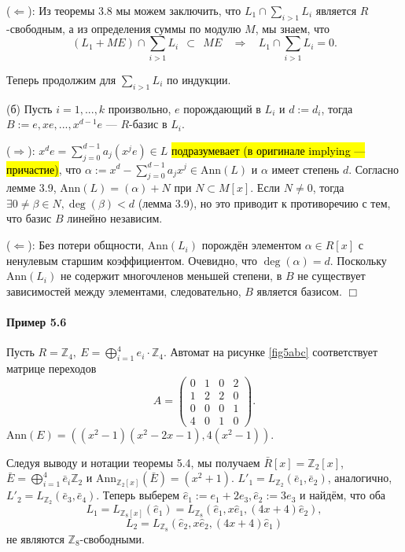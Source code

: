 \documentclass[a4paper,12pt]{article}
\newcommand{\hatei}[1]{\hat{e}_{#1}}
\newcommand{\Ann}{\text{Ann}}
\begin{document}
($\Leftarrow$): Из теоремы 3.8 мы можем заключить, что $L_1 \cap \sum_{i>1} L_i$ является $R$-свободным, а из определения суммы по модулю $M$, мы знаем, что
$$
(L_1 + M E) \cap \sum_{i>1} L_i ~~ \subset ~~ ME ~~~~ \Rightarrow ~~~~ L_1 \cap \sum_{i>1} L_i = 0.
$$

Теперь продолжим для $\sum_{i>1} L_i$ по индукции.

(б) Пусть $i = 1, ..., k$ произвольно, $e$ порождающий в $L_i$ и $d:=d_i$, тогда $B:={e, xe, ..., x^{d-1}e}$ --- $R$-базис в $L_i$.

($\Rightarrow$): $x^d e = \sum_{j = 0}^{d - 1} a_j (x^j e) \in L$ \hl{подразумевает (в оригинале implying --- причастие)}, что $\alpha := x^d - \sum_{j=0}^{d-1} a_j x^j \in \Ann(L)$ и $\alpha$ имеет степень $d$. Согласно лемме 3.9, $\Ann(L) = (\alpha) + N$ при $N \subset M[x]$. Если $N \ne 0$, тогда $\exists 0 \ne \beta \in N, \deg(\beta) < d$ (лемма 3.9), но это приводит к противоречию с тем, что базис $B$ линейно независим.

($\Leftarrow$): Без потери общности, $\Ann(L_i)$ порождён элементом $\alpha \in R[x]$ с ненулевым старшим коэффициентом. Очевидно, что $\deg(\alpha) = d$. Поскольку $\Ann(L_i)$ не содержит многочленов меньшей степени, в $B$ не существует зависимостей между элементами, следовательно, $B$ является базисом. $\Box$


\paragraph{Пример 5.6}
Пусть $R = \mathbb{Z}_4, ~ E=\bigoplus_{i=1}^4 e_i \cdot \mathbb{Z}_4$. Автомат на рисунке \ref{fig5abc} соответствует матрице переходов $${ A =
	\begin{pmatrix}
		0 & 1 & 0 & 2\\
		1 & 2 & 2 & 0\\
		0 & 0 & 0 & 1\\
		4 & 0 & 1 & 0
\end{pmatrix}}.$$ $\Ann(E) = ((x^2 - 1)(x^2 - 2x - 1), 4(x^2 - 1))$.

Следуя выводу и нотации теоремы 5.4, мы получаем $\bar{R}[x] = \mathbb{Z}_2 [x]$, $\bar{E} = \bigoplus_{i=1}^4 \bar{e}_i \mathbb{Z}_2$ и $\Ann_{\mathbb{Z}_2[x]}(\bar{E}) = (x^2 + 1)$. $L'_1 = L_{\mathbb{Z}_2}(\bar{e}_1, \bar{e}_2)$, аналогично, $L'_2 = L_{\mathbb{Z}_2}(\bar{e}_3, \bar{e}_4)$. Теперь выберем $\hatei{1} := e_1 + 2e_3, \hatei{2} := 3e_3$ и найдём, что оба
$$ L_1 = L_{\mathbb{Z}_8[x]}(\hatei{1}) =  L_{\mathbb{Z}_8}(\hatei{1}, x \hatei{1}, (4x + 4) \hatei{2}), $$
$$ L_2 = L_{\mathbb{Z}_8}(\hatei{2}, x \hatei{2}, (4x + 4) \hatei{1})$$
не являются $\mathbb{Z}_8$-свободными.
\end{document}
